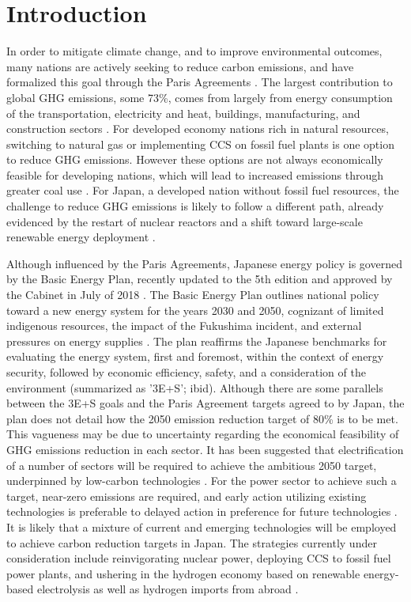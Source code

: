 \section{Introduction} \label{Introduction}
In order to mitigate climate change, and to improve environmental outcomes, many nations are actively seeking to reduce carbon emissions, and have formalized this goal through the Paris Agreements \cite{united_nations_framework_convention_on_climate_change_unfccc_submission_2015}. The largest contribution to global \gls{GHG} emissions, some 73\%, comes from largely from energy consumption of the transportation, electricity and heat, buildings, manufacturing, and construction sectors \cite{ge_4_2020}. For developed economy nations rich in natural resources, switching to natural gas or implementing \gls{CCS} on fossil fuel plants is one option to reduce GHG emissions. However these options are not always economically feasible for developing nations, which will lead to increased emissions through greater coal use \cite{international_energy_agency_latest_2019}. For Japan, a developed nation without fossil fuel resources, the challenge to reduce GHG emissions is likely to follow a different path, already evidenced by the restart of nuclear reactors and a shift toward large-scale renewable energy deployment \cite{international_energy_agency_latest_2019}.

Although influenced by the Paris Agreements, Japanese energy policy is governed by the Basic Energy Plan, recently updated to the 5th edition and approved by the Cabinet in July of 2018 \cite{noauthor_japans_2018}. The Basic Energy Plan outlines national policy toward a new energy system for the years 2030 and 2050, cognizant of limited indigenous resources, the impact of the Fukushima incident, and external pressures on energy supplies \cite{meti_annual_2018}. The plan reaffirms the Japanese benchmarks for evaluating the energy system, first and foremost, within the context of energy security, followed by economic efficiency, safety, and a consideration of the environment (summarized as '3E+S'; ibid). Although there are some parallels between the 3E+S goals and the Paris Agreement targets agreed to by Japan, the plan does not detail how the 2050 emission reduction target of 80\% is to be met. This vagueness may be due to uncertainty regarding the economical feasibility of GHG emissions reduction in each sector. It has been suggested that electrification of a number of sectors will be required to achieve the ambitious 2050 target, underpinned by low-carbon technologies \cite{matsuo_quantitative_2018}. For the power sector to achieve such a target, near-zero emissions are required, and early action utilizing existing technologies is preferable to delayed action in preference for future technologies \cite{ashina_roadmap_2012}. It is likely that a mixture of current and emerging technologies will be employed to achieve carbon reduction targets in Japan. The strategies currently under consideration include reinvigorating nuclear power, deploying \gls{CCS} to fossil fuel power plants, and ushering in the hydrogen economy based on renewable energy-based electrolysis as well as hydrogen imports from abroad \cite{ashina_roadmap_2012, matsuo_quantitative_2018, noauthor_basic_2017}. 

